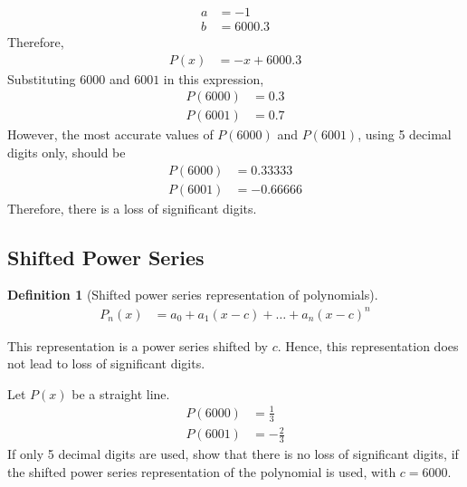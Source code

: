 \documentclass[fleqn, a4paper, 12pt, twoside]{article}
\theoremstyle{definition}
\newtheorem{definition}{Definition}
\theoremstyle{theorem}
\begin{document}
\begin{solution}
\begin{align*}
		a &= -1\\
		b &= 6000.3
	\end{align*}
	Therefore,
	\begin{align*}
		P(x) &= -x + 6000.3
	\end{align*}
	Substituting $6000$ and $6001$ in this expression,
	\begin{align*}
		P(6000) &= 0.3\\
		P(6001) &= 0.7
	\end{align*}
	However, the most accurate values of $P(6000)$ and $P(6001)$, using 5 decimal digits only, should be
	\begin{align*}
		P(6000) &= 0.33333\\
		P(6001) &= -0.66666
	\end{align*}
	Therefore, there is a loss of significant digits.
\end{solution}

\subsection{Shifted Power Series}

\begin{definition}[Shifted power series representation of polynomials]
	\begin{align*}
		P_n(x) &= a_0 + a_1 (x - c) + \dots + a_n (x - c)^n
	\end{align*}
\end{definition}

This representation is a power series shifted by $c$.
Hence, this representation does not lead to loss of significant digits.

\begin{question}
	Let $P(x)$ be a straight line.
	\begin{align*}
		P(6000) &= \frac{1}{3}\\
		P(6001) &= -\frac{2}{3}
	\end{align*}
	If only 5 decimal digits are used, show that there is no loss of significant digits, if the shifted power series representation of the polynomial is used, with $c = 6000$.
\end{question}
\end{document}
